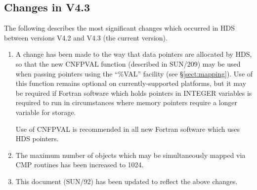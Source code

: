 \documentclass[twoside,11pt]{article}
\newcommand{\xref}[3]{#1}
\newcommand{\xlabel}[1]{}
\renewcommand{\_}{\texttt{\symbol{95}}}
\newcommand{\qt}[1]{``#1''}
\newcommand{\qt}[1]{{\tt{"}}#1{\tt{"}}}
\begin{document}
\newpage
\subsection{\xlabel{list_of_most_recent_changes}Changes in V4.3}

The following describes the most significant changes which occurred in HDS
between versions V4.2 and V4.3 (the current version).

\begin{enumerate}
\item A change has been made to the way that data pointers are
allocated by HDS, so that the new \xref{CNF\_PVAL}{sun209}{CNF_PVAL}
function (described in \xref{SUN/209}{sun209}{}) may be used when
passing pointers using the \qt{\%VAL} facility (see
\S\ref{sect:mapping}). Use of this function remains optional on
currently-supported platforms, but it may be required if Fortran
software which holds pointers in INTEGER variables is required to run
in circumstances where memory pointers require a longer variable for
storage.

Use of CNF\_PVAL is recommended in all new Fortran software which uses
HDS pointers.

\item The maximum number of objects which may be simultaneously mapped
via CMP\_ routines has been increased to 1024.

\item This document (\xref{SUN/92}{sun92}{}) has been updated to
reflect the above changes.
\end{enumerate}
\end{document}
